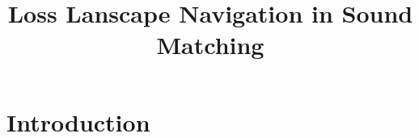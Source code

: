 \documentclass[12pt, oneside]{article} %
\title{Loss Lanscape Navigation in Sound Matching}
\begin{document}
\maketitle

\section{Introduction}



\end{document}
